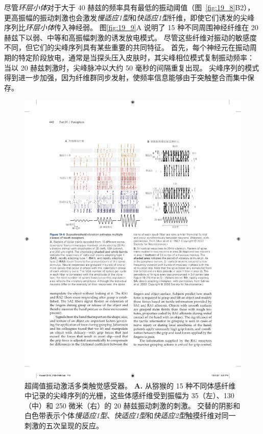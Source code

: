 尽管\textit{环层小体}对于大于 40 赫兹的频率具有最低的振动阈值（图~\ref{fig:19_8}B2），更高振幅的振动刺激也会激发\textit{慢适应1型}和\textit{快适应1型}纤维，即使它们诱发的尖峰序列比\textit{环层小体}传入神经弱。
图\ref{fig:19_9}A 说明了 15 种不同周围神经纤维在 20 赫兹下以弱、中等和高振幅刺激的诱发放电模式。
尽管这些纤维对振动的敏感度不同，但它们的尖峰序列具有某些重要的共同特征。
首先，每个神经元在振动周期的特定阶段放电，通常是当探头压入皮肤时，其尖峰相位模式复制振动频率：
当以 20 赫兹刺激时，尖峰脉冲以大约 50 毫秒的间隔重复出现。
尖峰序列的模式得到进一步加强，因为纤维群同步发射，使频率信息能够由于突触整合而集中保存。


\begin{figure}[htbp]
	\centering
	\includegraphics[width=1.0\linewidth]{chap19/fig_19_9}
	\caption{超阈值振动激活多类触觉感受器。 
		\textbf{A.} 从猕猴的 15 种不同体感纤维中记录的尖峰序列的光栅，这些体感纤维受到振幅为 35（左）、130（中）和 250 微米（右）的 20 赫兹振动刺激的刺激。
		交替的阴影和白色带表示个体\textit{慢适应1型}、\textit{快适应1型}和\textit{快适应2型}触摸纤维对同一刺激的五次呈现的反应。
}
\end{figure}
